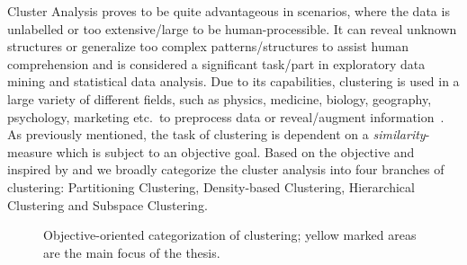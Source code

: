 Cluster Analysis proves to be quite advantageous in scenarios, where the data is unlabelled or too extensive/large to be human-processible. It can reveal unknown structures or generalize too complex patterns/structures to assist human comprehension and is considered a significant task/part in exploratory data mining and statistical data analysis. Due to its capabilities, clustering is used in a large variety of different fields, such as physics, medicine, biology, geography, psychology, marketing etc.\ to preprocess data or reveal/augment information~\cite{kriegel2009clustering}.
As previously mentioned, the task of clustering is dependent on a \textit{similarity}-measure which is subject to an objective goal. Based on the objective and inspired by \textcite{validationhalkidi2001clustering} and \textcite[Ch.10.1.3]{han2011data} we broadly categorize the cluster analysis into four branches of clustering: Partitioning Clustering, Density-based Clustering, Hierarchical Clustering and Subspace Clustering. 

\begin{figure}
    \centering
    \caption{Objective-oriented categorization of clustering; yellow marked areas are the main focus of the thesis.}
    \label{fig:clusteringtree}
\end{figure}


